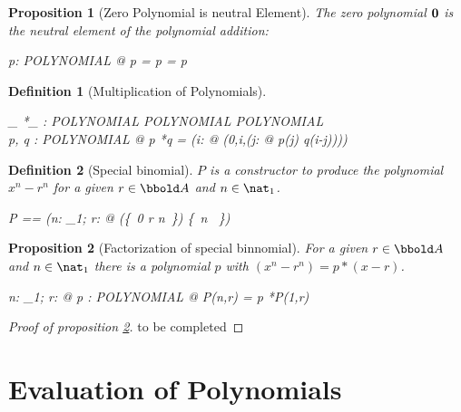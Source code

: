 \documentclass[12pt]{scrartcl}
\newtheorem{prop}{Proposition}[section]
\newtheorem{zdef}{Definition}[section]
\begin{document}
\begin{prop}[Zero Polynomial is neutral Element]
  \label{prop:zero-polynomial-neutral-element}
  The zero polynomial $\mathbf{0}$ is the neutral element of the
  polynomial addition:
  \begin{zed}
    \forall p: POLYNOMIAL @ p \polyplus \zeropol = \zeropol \polyplus
    p = p
  \end{zed}
\end{prop}

\newcommand{\polymult}{*}
\begin{zdef}[Multiplication of Polynomials]
  \label{zdef:polynomial-multiplication}
  \begin{axdef}
    \_ \polymult \_ : POLYNOMIAL \cross POLYNOMIAL \fun POLYNOMIAL\\
    \where
    \forall p, q : POLYNOMIAL @ p \polymult q = (\lambda i: \nat @
    \finsum(0,i,(\lambda j: \nat @ p(j) \amult q(i-j))))
  \end{axdef}
\end{zdef}

\begin{zdef}[Special binomial]
  \label{zdef:special-binnomial}
  $P$ is a constructor to produce the polynomial $x^n - r^n$ for a
  given $r \in \arithmos$ and $n \in \nat_1$.
  \begin{zed}
    P == (\lambda n: \nat_1; r: \arithmos @ (\zeropol \oplus \{~0 \mapsto
    r \apwr n~\}) \oplus \{~n \mapsto \aone ~\})
  \end{zed}
\end{zdef}

\begin{prop}[Factorization of special binnomial]
  \label{prop:factorization-binomial}
  For a given $r \in \arithmos$ and $n \in \nat_1$ there is a polynomial
  $p$ with $(x^n-r^n) = p \polymult (x - r)$.
  \begin{zed}
    \forall n: \nat_1; r: \arithmos @ \exists p : POLYNOMIAL @ P(n,r) = p
    \polymult P(1,r)
  \end{zed}
\end{prop}

\begin{proof}[Proof of proposition \ref{prop:factorization-binomial}]
  to be completed
\end{proof}

\section{Evaluation of Polynomials}
\label{sec:evaluation}
\end{document}
